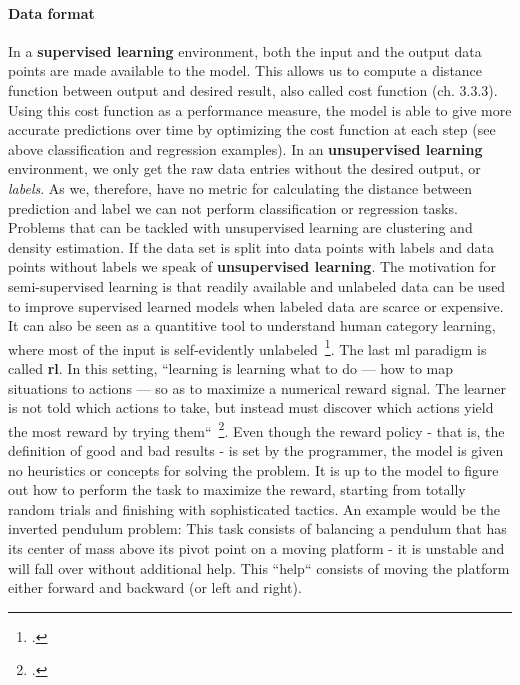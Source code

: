 \paragraph*{Data format}
In a \textbf{supervised learning} environment, both the input and the output data points are made available to the model. This allows us to compute a distance function between output and desired result, also called cost function (ch. 3.3.3). Using this cost function as a performance measure, the model is able to give more accurate predictions over time by optimizing the cost function at each step (see above classification and regression examples). In an \textbf{unsupervised learning} environment, we only get the raw data entries without the desired output, or \textit{labels}. As we, therefore, have no metric for calculating the distance between prediction and label we can not perform classification or regression tasks. Problems that can be tackled with unsupervised learning are clustering and density estimation. If the data set is split into data points with labels and data points without labels we speak of \textbf{unsupervised learning}. The motivation for semi-supervised learning is that readily available and unlabeled data can be used to improve supervised learned models when labeled data are scarce or expensive. It can also be seen as a quantitive tool to understand human category learning, where most of the input is self-evidently unlabeled~\footcite{6813505}. The last \gls{ml} paradigm is called \textbf{\gls{rl}}. In this setting, “learning is learning what to do — how to map situations to actions — so as to maximize a numerical reward signal. The learner is not told which actions to take, but instead must discover which actions yield the most reward by trying them“~\footcite[1]{10.5555/551283}. Even though the reward policy - that is, the definition of good and bad results - is set by the programmer, the model is given no heuristics or concepts for solving the problem. It is up to the model to figure out how to perform the task to maximize the reward, starting from totally random trials and finishing with sophisticated tactics. An example would be the inverted pendulum problem: This task consists of balancing a pendulum that has its center of mass above its pivot point on a moving platform - it is unstable and will fall over without additional help. This “help“ consists of moving the platform either forward and backward (or left and right).

